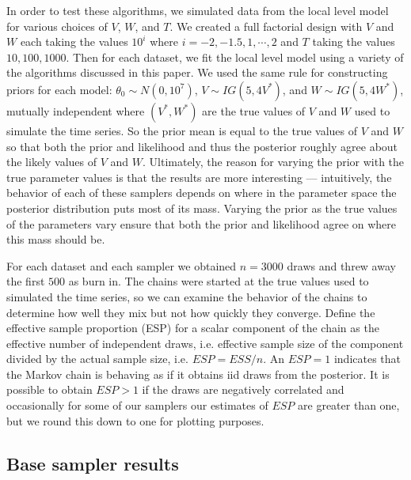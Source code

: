 \documentclass{article}
\begin{document}
In order to test these algorithms, we simulated data from the local level model for various choices of $V$, $W$, and $T$. We created a full factorial design with $V$ and $W$ each taking the values $10^{i}$ where $i=-2,-1.5,1,\cdots,2$ and $T$ taking the values $10, 100, 1000$. Then for each dataset, we fit the local level model using a variety of the algorithms discussed in this paper. We used the same rule for constructing priors for each model: $\theta_0\sim N(0,10^7)$, $V\sim IG(5, 4V^*)$, and $W\sim IG(5, 4W^*)$, mutually independent where $(V^*,W^*)$ are the true values of $V$ and $W$ used to simulate the time series. So the prior mean is equal to the true values of $V$ and $W$ so that both the prior and likelihood and thus the posterior roughly agree about the likely values of $V$ and $W$. Ultimately, the reason for varying the prior with the true parameter values is that the results are more interesting --- intuitively, the behavior of each of these samplers depends on where in the parameter space the posterior distribution puts most of its mass. Varying the prior as the true values of the parameters vary ensure that both the prior and likelihood agree on where this mass should be.

For each dataset and each sampler we obtained $n=3000$ draws and threw away the first $500$ as burn in. The chains were started at the true values used to simulated the time series, so we can examine the behavior of the chains to determine how well they mix but not how quickly they converge. Define the effective sample proportion (ESP) for a scalar component of the chain as the effective number of independent draws, i.e. effective sample size \cite{gelman2003bayesian} of the component divided by the actual sample size, i.e. $ESP=ESS/n$. An $ESP=1$ indicates that the Markov chain is behaving as if it obtains iid draws from the posterior. It is possible to obtain $ESP>1$ if the draws are negatively correlated and occasionally for some of our samplers our estimates of $ESP$ are greater than one, but we round this down to one for plotting purposes.

\subsection{Base sampler results}
\end{document}
